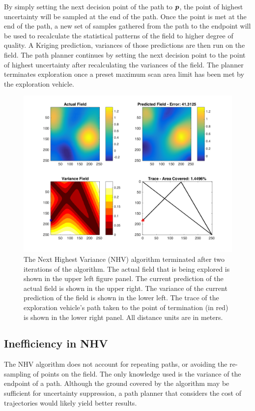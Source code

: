 By simply setting the next decision point of the path to ${\it{\boldsymbol{p}}}$, the point of highest uncertainty will be sampled at the end of the path. Once the point is met at the end of the path, a new set of samples gathered from the path to the endpoint will be used to recalculate the statistical patterns of the field to higher degree of quality. A Kriging prediction, variances of those predictions are then run on the field. The path planner continues by setting the next decision point to the point of highest uncertainty after recalculating the variances of the field. The planner terminates exploration once a preset maximum scan area limit has been met by the exploration vehicle.

\begin{figure}[hb!]
	\centering
	\includegraphics[width=0.95\linewidth]{figures/nhv_4panel.png}
    \captionsetup{skip=0.20\baselineskip}
	\ssp
	\caption{The Next Highest Variance (NHV) algorithm terminated after two iterations of the algorithm. The actual field that is being explored is shown in the upper left figure panel. The current prediction of the actual field is shown in the upper right. The variance of the current prediction of the field is shown in the lower left. The trace of the exploration vehicle's path taken to the point of termination (in red) is shown in the lower right panel. All distance units are in meters.}
	\label{fig:nhvpp}
\end{figure}

\subsection{Inefficiency in NHV}
The NHV algorithm does not account for repeating paths, or avoiding the re-sampling of points on the field. The only knowledge used is the variance of the endpoint of a path. Although the ground covered by the algorithm may be sufficient for uncertainty suppression, a path planner that considers the cost of trajectories would likely yield better results.

